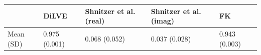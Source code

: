\begin{tabular}{lllll}
\toprule
 & DiLVE & Shnitzer et al. (real) & Shnitzer et al. (imag) & FK \\
\midrule
Mean (SD) & 0.975 (0.001) & 0.068 (0.052) & 0.037 (0.028) & 0.943 (0.003) \\
\bottomrule
\end{tabular}
